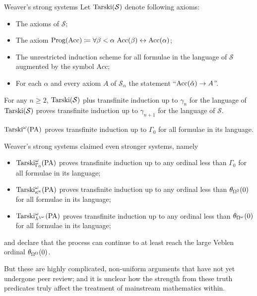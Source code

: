 \documentclass{beamer}
\begin{document}
\begin{frame}{Weaver's strong systems}
  Let $\mathrm{Tarski}\mleft(\mathcal{S}\mright)$ denote following axioms:
  \begin{itemize}
    \item The axioms of $\mathcal{S}$;
    \item The axiom $\mathrm{Prog}\mleft(\mathrm{Acc}\mright) \coloneqq \forall \beta < \alpha \ \mathrm{Acc}\mleft(\beta\mright) \leftrightarrow \mathrm{Acc}\mleft(\alpha\mright)$;
    \item The unrestricted induction scheme for all formulae in the language of $\mathcal{S}$ augmented by the symbol $\mathrm{Acc}$;
    \item For each $\alpha$ and every axiom $A$ of $\mathcal{S}_\alpha$ the statement ``$\mathrm{Acc}\mleft(\hat{\alpha}\mright) \rightarrow A$''.
  \end{itemize}

  \begin{lemma}
    For any $n \geq 2$, $\mathrm{Tarski}\mleft(\mathcal{S}\mright)$ plus transfinite induction up to $\gamma_n$ for the language of $\mathrm{Tarski}\mleft(\mathcal{S}\mright)$ proves transfinite induction up to $\gamma_{n + 1}$ for the language of $\mathcal{S}$.
  \end{lemma}

  \begin{corollary}
    $\mathrm{Tarski}^\omega\mleft(\mathrm{PA}\mright)$ proves transfinite induction up to $\Gamma_0$ for all formulae in its language.
  \end{corollary}
\end{frame}

\begin{frame}{Weaver's strong systems}
   claimed even stronger systems, namely
  \begin{itemize}
    \item $\mathrm{Tarski}_{\Gamma_0}^\omega\mleft(\mathrm{PA}\mright)$ proves transfinite induction up to any ordinal less than $\Gamma_0$ for all formulae in its language;
    \item $\mathrm{Tarski}_{\kappa^\kappa}^\omega\mleft(\mathrm{PA}\mright)$ proves transfinite induction up to any ordinal less than $\theta_{\Omega^2}\mleft(0\mright)$ for all formulae in its language;
    \item $\mathrm{Tarski}_{\lambda^{\lambda^{\omega}}}^\omega\mleft(\mathrm{PA}\mright)$ proves transfinite induction up to any ordinal less than $\theta_{\Omega^\omega}\mleft(0\mright)$ for all formulae in its language;
  \end{itemize}
  and declare that the process can continue to at least reach the large Veblen ordinal $\theta_{\Omega^\Omega}\mleft(0\mright)$.

  \vspace{1em}

  But these are highly complicated, non-uniform arguments that have not yet undergone peer review; and it is unclear how the strength from these truth predicates truly affect the treatment of mainstream mathematics within.
\end{frame}
\end{document}
